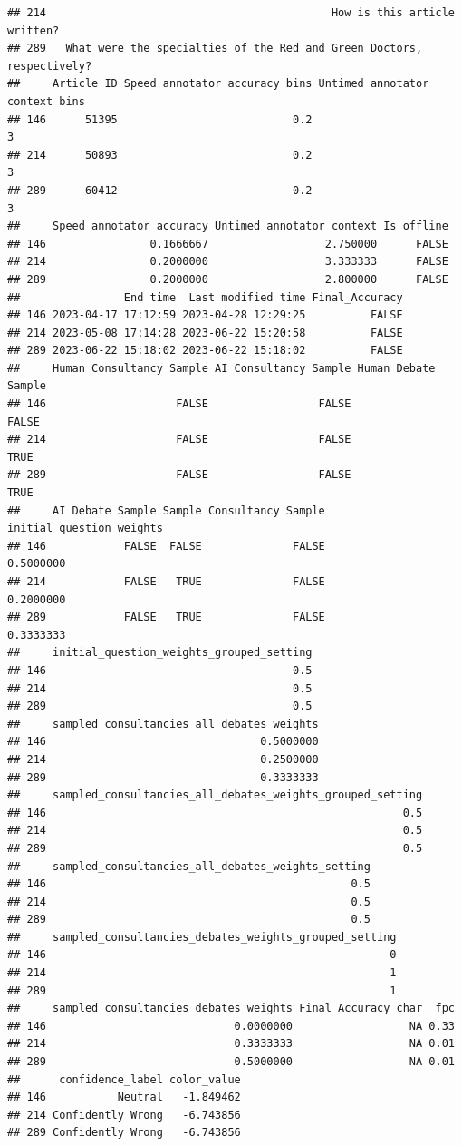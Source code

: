 \documentclass[
]{article}
\begin{document}
\begin{verbatim}
## 214                                            How is this article written?
## 289   What were the specialties of the Red and Green Doctors, respectively?
##     Article ID Speed annotator accuracy bins Untimed annotator context bins
## 146      51395                           0.2                              3
## 214      50893                           0.2                              3
## 289      60412                           0.2                              3
##     Speed annotator accuracy Untimed annotator context Is offline
## 146                0.1666667                  2.750000      FALSE
## 214                0.2000000                  3.333333      FALSE
## 289                0.2000000                  2.800000      FALSE
##                End time  Last modified time Final_Accuracy
## 146 2023-04-17 17:12:59 2023-04-28 12:29:25          FALSE
## 214 2023-05-08 17:14:28 2023-06-22 15:20:58          FALSE
## 289 2023-06-22 15:18:02 2023-06-22 15:18:02          FALSE
##     Human Consultancy Sample AI Consultancy Sample Human Debate Sample
## 146                    FALSE                 FALSE               FALSE
## 214                    FALSE                 FALSE                TRUE
## 289                    FALSE                 FALSE                TRUE
##     AI Debate Sample Sample Consultancy Sample initial_question_weights
## 146            FALSE  FALSE              FALSE                0.5000000
## 214            FALSE   TRUE              FALSE                0.2000000
## 289            FALSE   TRUE              FALSE                0.3333333
##     initial_question_weights_grouped_setting
## 146                                      0.5
## 214                                      0.5
## 289                                      0.5
##     sampled_consultancies_all_debates_weights
## 146                                 0.5000000
## 214                                 0.2500000
## 289                                 0.3333333
##     sampled_consultancies_all_debates_weights_grouped_setting
## 146                                                       0.5
## 214                                                       0.5
## 289                                                       0.5
##     sampled_consultancies_all_debates_weights_setting
## 146                                               0.5
## 214                                               0.5
## 289                                               0.5
##     sampled_consultancies_debates_weights_grouped_setting
## 146                                                     0
## 214                                                     1
## 289                                                     1
##     sampled_consultancies_debates_weights Final_Accuracy_char  fpc
## 146                             0.0000000                  NA 0.33
## 214                             0.3333333                  NA 0.01
## 289                             0.5000000                  NA 0.01
##      confidence_label color_value
## 146           Neutral   -1.849462
## 214 Confidently Wrong   -6.743856
## 289 Confidently Wrong   -6.743856
\end{verbatim}
\end{document}
